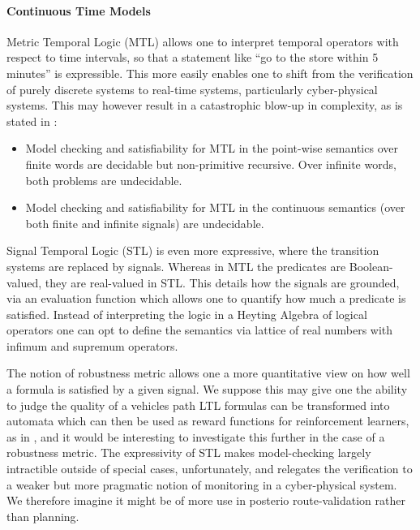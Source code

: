 \documentclass{article}
\begin{document}
\paragraph{Continuous Time Models}

Metric Temporal Logic (MTL) allows one to interpret temporal operators with
respect to time intervals, so that a statement like ``go to the store within 5
minutes'' is expressible. This more easily enables one to shift from the
verification of purely discrete systems to real-time systems, particularly
cyber-physical systems. This may however result in a catastrophic blow-up in complexity, as is stated in \cite{Bouyer2018}:

\begin{itemize}
\item Model checking and satisfiability for MTL in the point-wise semantics over
finite words are decidable but non-primitive recursive. Over infinite words,
both problems are undecidable.
\item Model checking and satisfiability for MTL in the continuous
 semantics (over both finite and infinite signals) are undecidable.
\end{itemize}

Signal Temporal Logic (STL) is even more expressive, where the transition
systems are replaced by signals. Whereas in MTL the predicates are
Boolean-valued, they are real-valued in STL. This details how the signals are
grounded, via an evaluation function which allows one to quantify how much a
predicate is satisfied. Instead of interpreting the logic in a Heyting Algebra
of logical operators one can opt to define the semantics via lattice of real
numbers with infimum and supremum operators.

The notion of robustness metric \cite{robustnessMet} allows one a more
quantitative view on how well a formula is satisfied by a given signal. We
suppose this may give one the ability to judge the quality of a vehicles path
LTL formulas can be transformed into automata which can then be used as reward
functions for reinforcement learners, as in \cite{ltlRein}, and it would be
interesting to investigate this further in the case of a robustness metric. The
expressivity of STL makes model-checking largely intractible outside of special
cases, unfortunately, and relegates the verification to a weaker but more
pragmatic notion of monitoring in a cyber-physical system. We therefore imagine
it might be of more use in posterio route-validation rather than planning.
\end{document}
